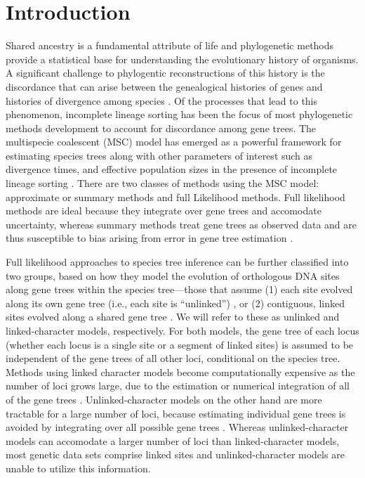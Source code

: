 \section{Introduction}

Shared ancestry is a fundamental attribute of life and phylogenetic methods 
provide a statistical base for understanding the evolutionary history of organisms.
A significant challenge to phylogentic reconstructions of this history is the 
discordance that can arise between the genealogical histories of genes and 
histories of divergence among species \citep{maddisonGeneTreesSpecies1997}.
Of the processes that lead to this phenomenon, incomplete lineage sorting has 
been the focus of most phylogenetic methods development to account for discordance
among gene trees. The multispecie coalescent (MSC) model has emerged as a 
powerful framework for estimating species trees along with other parameters of 
interest such as divergence times, and effective population sizes in the 
presence of incomplete lineage sorting \citep{xuChallengesSpeciesTree2016}.
There are two classes of methods using the MSC model: approximate or summary 
methods and full Likelihood methods. Full likelihood methods are ideal because they 
integrate over gene trees and accomodate uncertainty, whereas summary methods 
treat gene trees as observed data and are thus susceptible to bias arising from 
error in gene tree estimation \citep{rannalaEfficientBayesianSpecies2017}.

Full likelihood approaches to species 
tree inference can be further classified into two groups, based on how they model the 
evolution of orthologous DNA sites along gene trees within the species 
tree---those that assume (1) each site evolved along its own gene tree 
(i.e., each site is ``unlinked'') 
\citep{bryantInferringSpeciesTrees2012, maioPoMoAlleleFrequencyBased2015}, 
or (2) contiguous, linked sites evolved along a shared gene tree 
\citep{liuSpeciesTreesGene2007, Heled2010, ogilvieStarBEAST2BringsFaster2017, 
yangBPPProgramSpecies2015}. We will refer to these as unlinked and 
linked-character models, respectively. For both models, the gene tree of each 
locus (whether each locus is a single site or a segment of linked sites) 
is assumed to be independent of the gene 
trees of all other loci, conditional on the species tree.
Methods using linked character models become computationally expensive as the
number of loci grows large, due to the estimation or numerical integration of
all of the gene trees \citep{bryantInferringSpeciesTrees2012}.
Unlinked-character models on the other 
hand are more tractable for a large number of loci, because  estimating 
individual gene trees is avoided by integrating over all possible gene trees 
\citep{bryantInferringSpeciesTrees2012}.
Whereas unlinked-character models can accomodate a larger number of loci than
linked-character models, most genetic data sets comprise linked sites and
unlinked-character models are unable to utilize this information.

